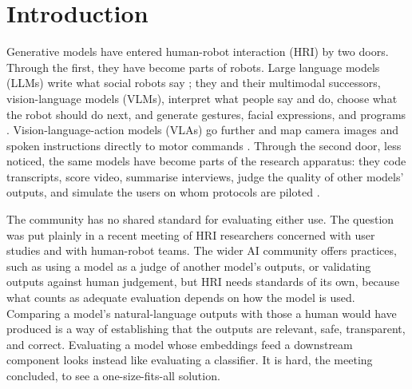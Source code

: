 \section{Introduction}
\label{sec:intro}

Generative models have entered human-robot interaction (HRI) by two doors.
Through the first, they have become parts of robots. Large language models
(LLMs) write what social robots say
\cite{williams2024scarecrows,kim2024understanding,wang2026how}; they and
their multimodal successors, vision-language models (VLMs), interpret what
people say and do, choose what the robot should do next, and generate
gestures, facial expressions, and programs
\cite{mahadevan2024generative,wang2024lami}. Vision-language-action models
(VLAs) go further and map camera images and spoken instructions directly to
motor commands \cite{zitkovich2023rt2,kim2025openvla,black2025pi0}. Through
the second door, less noticed, the same models have become parts of the
research apparatus: they code transcripts, score video, summarise interviews,
judge the quality of other models' outputs, and simulate the users on whom
protocols are piloted \cite{gilardi2023chatgpt,ziems2024can,zheng2023judging}.

The community has no shared standard for evaluating either use. The question
was put plainly in a recent meeting of HRI researchers concerned with user
studies and with human-robot teams. The wider AI community offers practices,
such as using a model as a judge of another model's outputs, or validating
outputs against human judgement, but HRI needs standards of its own, because
what counts as adequate evaluation depends on how the model is used.
Comparing a model's natural-language outputs with those a human would have
produced is a way of establishing that the outputs are relevant, safe,
transparent, and correct. Evaluating a model whose embeddings feed a
downstream component looks instead like evaluating a classifier. It is hard,
the meeting concluded, to see a one-size-fits-all solution.

